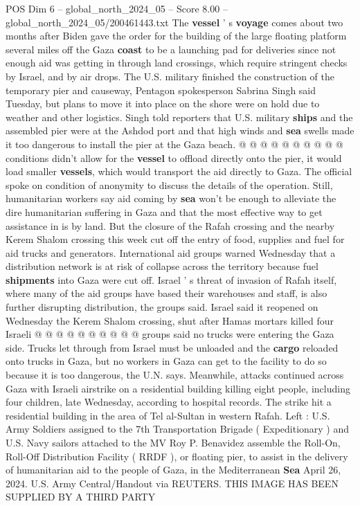 \begin{textsample}{POS Dim 6 – global\_north\_2024\_05 – Score 8.00 – global\_north\_2024\_05/200461443.txt}
The \textbf{vessel} ' s \textbf{voyage} comes about two months after Biden gave the order for the building of the large floating platform several miles off the Gaza \textbf{coast} to be a launching pad for deliveries since not enough aid was getting in through land crossings, which require stringent checks by Israel, and by air drops.
The U.S. military finished the construction of the temporary pier and causeway, Pentagon spokesperson Sabrina Singh said Tuesday, but plans to move it into place on the shore were on hold due to weather and other logistics.
Singh told reporters that U.S. military \textbf{ships} and the assembled pier were at the Ashdod port and that high winds and \textbf{sea} swells made it too dangerous to install the pier at the Gaza beach. @ @ @ @ @ @ @ @ @ @ conditions didn't allow for the \textbf{vessel} to offload directly onto the pier, it would load smaller \textbf{vessels}, which would transport the aid directly to Gaza.
The official spoke on condition of anonymity to discuss the details of the operation.
Still, humanitarian workers say aid coming by \textbf{sea} won't be enough to alleviate the dire humanitarian suffering in Gaza and that the most effective way to get assistance in is by land.
But the closure of the Rafah crossing and the nearby Kerem Shalom crossing this week cut off the entry of food, supplies and fuel for aid trucks and generators.
International aid groups warned Wednesday that a distribution network is at risk of collapse across the territory because fuel \textbf{shipments} into Gaza were cut off.
Israel ' s threat of invasion of Rafah itself, where many of the aid groups have based their warehouses and staff, is also further disrupting distribution, the groups said.
Israel said it reopened on Wednesday the Kerem Shalom crossing, shut after Hamas mortars killed four Israeli @ @ @ @ @ @ @ @ @ @ groups said no trucks were entering the Gaza side.
Trucks let through from Israel must be unloaded and the \textbf{cargo} reloaded onto trucks in Gaza, but no workers in Gaza can get to the facility to do so because it is too dangerous, the U.N. says.
Meanwhile, attacks continued across Gaza with Israeli airstrike on a residential building killing eight people, including four children, late Wednesday, according to hospital records.
The strike hit a residential building in the area of Tel al-Sultan in western Rafah.
Left : U.S.
Army Soldiers assigned to the 7th Transportation Brigade ( Expeditionary ) and U.S.
Navy sailors attached to the MV Roy P.
Benavidez assemble the Roll-On, Roll-Off Distribution Facility ( RRDF ), or floating pier, to assist in the delivery of humanitarian aid to the people of Gaza, in the Mediterranean \textbf{Sea} April 26, 2024.
U.S.
Army Central/Handout via REUTERS.
THIS IMAGE HAS BEEN SUPPLIED BY A THIRD PARTY

\end{textsample}
